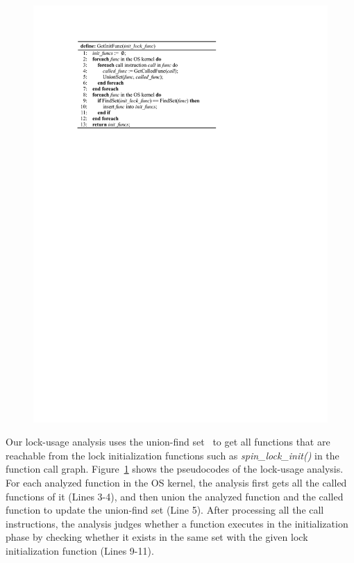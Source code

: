 \begin{figure}[htbp]
	\centering
	\includegraphics[width=0.9\linewidth]{figures/fig_pseudocode_lock_usage.pdf}
	\label{fig_pseudocode_lock_usage}
\end{figure}

Our lock-usage analysis uses the union-find set~\cite{Galler:ACM64} to get all 
functions that are reachable from the lock initialization functions such as 
{\em spin\_lock\_init()} in the function call graph. 
Figure~\ref{fig_pseudocode_lock_usage} shows the pseudocodes of the lock-usage 
analysis. For each analyzed function in the OS kernel, the analysis first gets 
all the called functions of it (Lines 3-4), and then union the analyzed  
function and the called function to update the union-find set (Line 5). After 
processing all the call instructions, the analysis judges whether a function 
executes in the initialization phase by checking whether it exists in the same 
set with the given lock initialization function (Lines 9-11).

